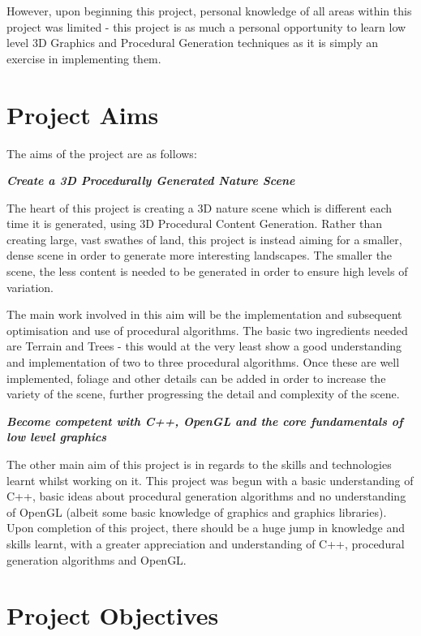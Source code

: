 \documentclass[a4paper,10pt]{report}
\begin{document}
However, upon beginning this project, personal knowledge of all areas within this project was limited - this project is as much a personal opportunity to learn low level 3D Graphics and Procedural Generation techniques as it is simply an exercise in implementing them. 

\clearpage
\section{Project Aims}
The aims of the project are as follows:\medskip

\textbf{\textit{Create a 3D Procedurally Generated Nature Scene}} \medskip

The heart of this project is creating a 3D nature scene which is different each time it is generated, using 3D Procedural Content Generation. Rather than creating large, vast swathes of land, this project is instead aiming for a smaller, dense scene in order to generate more interesting landscapes. The smaller the scene, the less content is needed to be generated in order to ensure high levels of variation.\medskip

The main work involved in this aim will be the implementation and subsequent optimisation and use of procedural algorithms. The basic two ingredients needed are Terrain and Trees - this would at the very least show a good understanding and implementation of two to three procedural algorithms. Once these are well implemented, foliage and other details can be added in order to increase the variety of the scene, further progressing the detail and complexity of the scene.  \medskip


\textbf{\textit{Become competent with C++, OpenGL and the core fundamentals of low level graphics}} \medskip

The other main aim of this project is in regards to the skills and technologies learnt whilst working on it. This project was begun with a basic understanding of C++, basic ideas about procedural generation algorithms and no understanding of OpenGL (albeit some basic knowledge of graphics and graphics libraries). Upon completion of this project, there should be a huge jump in knowledge and skills learnt, with a greater appreciation and understanding of C++, procedural generation algorithms and OpenGL.\medskip

\section{Project Objectives}
\end{document}
